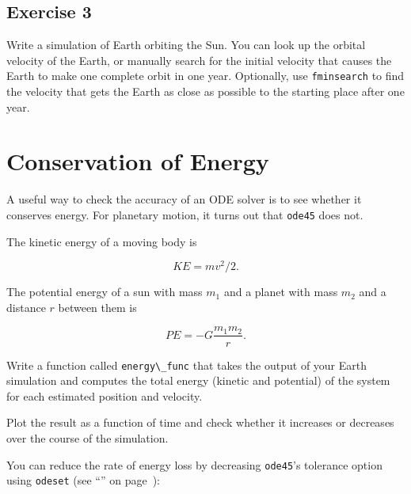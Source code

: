 
\subsection{Exercise 3}
Write a simulation of Earth orbiting the Sun.  You can look up the orbital velocity of the Earth, or manually search for the initial velocity that causes the Earth to make one complete orbit in one year.  Optionally, use \lstinline{fminsearch} to find the velocity that gets the Earth as close as possible to the starting place after one year.



\section{Conservation of Energy}

A useful way to check the accuracy of an ODE solver is to see whether it conserves energy.  For planetary motion, it turns out that \lstinline{ode45} does not.


The kinetic energy of a moving body is

\begin{equation*}
KE = m v^2 / 2.
\end{equation*}

The potential energy of a sun with mass $m_1$ and a
planet with mass $m_2$ and a distance $r$ between them is

\begin{equation*}
PE = -G \frac{m_1 m_2}{r}.
\end{equation*}

Write a function called \lstinline{energy\_func} that takes the output of
your Earth simulation and computes the total
energy (kinetic and potential) of the system for each estimated
position and velocity.

Plot the result as a function of time and
check whether it increases or decreases over the course of the simulation.


You can reduce the rate of energy loss by decreasing \lstinline{ode45}'s
tolerance option using \lstinline{odeset} (see ``'' on page~\pageref{events}):

